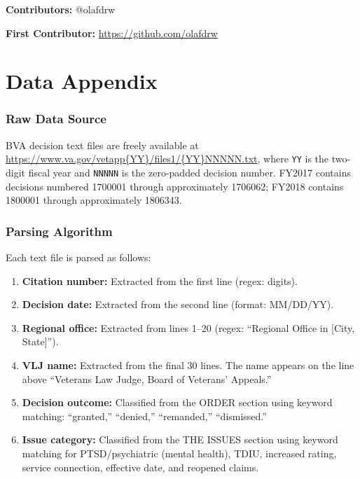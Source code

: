 \documentclass[12pt]{article}
\begin{document}
\noindent\textbf{Contributors:} @olafdrw

\noindent\textbf{First Contributor:} \url{https://github.com/olafdrw}

\label{apep_main_text_end}
\newpage


\newpage
\appendix

\section{Data Appendix}

\subsubsection*{Raw Data Source} BVA decision text files are freely available at \url{https://www.va.gov/vetapp{YY}/files1/{YY}NNNNN.txt}, where \texttt{YY} is the two-digit fiscal year and \texttt{NNNNN} is the zero-padded decision number. FY2017 contains decisions numbered 1700001 through approximately 1706062; FY2018 contains 1800001 through approximately 1806343.

\subsubsection*{Parsing Algorithm} Each text file is parsed as follows:
\begin{enumerate}
\item \textbf{Citation number:} Extracted from the first line (regex: digits).
\item \textbf{Decision date:} Extracted from the second line (format: MM/DD/YY).
\item \textbf{Regional office:} Extracted from lines 1--20 (regex: ``Regional Office in [City, State]'').
\item \textbf{VLJ name:} Extracted from the final 30 lines. The name appears on the line above ``Veterans Law Judge, Board of Veterans' Appeals.''
\item \textbf{Decision outcome:} Classified from the ORDER section using keyword matching: ``granted,'' ``denied,'' ``remanded,'' ``dismissed.''
\item \textbf{Issue category:} Classified from the THE ISSUES section using keyword matching for PTSD/psychiatric (mental health), TDIU, increased rating, service connection, effective date, and reopened claims.
\end{enumerate}
\end{document}
